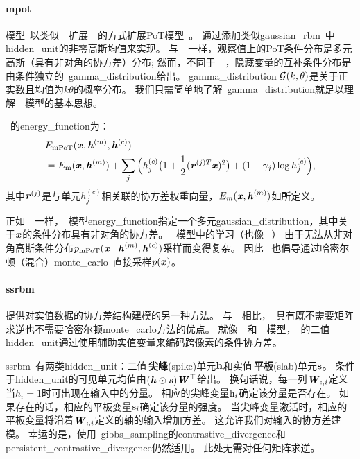  
\paragraph{\gls{mpot}}
模型~\citep{ranzato+mnih+hinton:2010-short}以类似~~扩展~~的方式扩展PoT模型~\citep{Welling2003a-small}。
通过添加类似\gls{gaussian_rbm}~中\gls{hidden_unit}的非零高斯均值来实现。
与~~一样，观察值上的PoT条件分布是多元高斯（具有非对角的协方差）分布; 然而，不同于~~，隐藏变量的互补条件分布是由条件独立的~\gls{gamma_distribution}给出。
\gls{gamma_distribution} $\mathcal{G}(k, \theta)$是关于正实数且均值为$k\theta$的概率分布。
我们只需简单地了解~\gls{gamma_distribution}就足以理解~~模型的基本思想。

~的\gls{energy_function}为：
\begin{align}
 &E_{\text{mPoT}}(\boldsymbol{\mathit{x}}, \boldsymbol{\mathit{h}}^{(m)}, \boldsymbol{\mathit{h}}^{(c)}) \\
 &= E_{\text{m}}(\boldsymbol{\mathit{x}}, \boldsymbol{\mathit{h}}^{(m)}) + \sum_j \Big( h_j^{(c)} \big( 1+\frac{1}{2}(\boldsymbol{\mathit{r}}^{(j)T}\boldsymbol{\mathit{x}})^2  \big)
 +(1-\gamma_j)\log h_j^{(c)} \Big),
\end{align}
其中$\boldsymbol{\mathit{r}}^{(j)}$是与单元$h_j^{(c)}$相关联的协方差权重向量，$E_m(\boldsymbol{\mathit{x}}, \boldsymbol{\mathit{h}}^{(m)})$如所定义。

正如~~一样，~模型\gls{energy_function}指定一个多元\gls{gaussian_distribution}，其中关于$\boldsymbol{\mathit{x}}$的条件分布具有非对角的协方差。
~模型中的学习（也像~ ） 由于无法从非对角高斯条件分布$p_{\text{mPoT}}(\boldsymbol{\mathit{x}}  \mid  \boldsymbol{\mathit{h}}^{(m)}, \boldsymbol{\mathit{h}}^{(c)}) $采样而变得复杂。
因此~\citet{ranzato+mnih+hinton:2010-short} 也倡导通过哈密尔顿（混合）\gls{monte_carlo}~\citep{Neal93b}直接采样$p(\boldsymbol{\mathit{x}})$。


\paragraph{\gls{ssrbm}} \citep{Courville+al-2011}提供对实值数据的协方差结构建模的另一种方法。
与~~相比，~具有既不需要矩阵求逆也不需要哈密尔顿\gls{monte_carlo}方法的优点。
就像~~和~~模型，~的二值\gls{hidden_unit}通过使用辅助实值变量来编码跨像素的条件协方差。


\gls{ssrbm}~有两类\gls{hidden_unit}：二值\,\textbf{尖峰}(spike)单元$\mathbf{h}$和实值\,\textbf{平板}(slab)单元$\mathbf{s}$。
条件于\gls{hidden_unit}的可见单元均值由$(\boldsymbol{\mathit{h}} \odot \boldsymbol{\mathit{s}})\boldsymbol{\mathit{W}}^\top$给出。
换句话说，每一列$\boldsymbol{\mathit{W}}_{:,i}$定义当$h_i=1$时可出现在输入中的分量。
相应的尖峰变量$\mathrm{h}_i$确定该分量是否存在。
如果存在的话，相应的平板变量$\mathrm{s}_i$确定该分量的强度。
当尖峰变量激活时，相应的平板变量将沿着$\boldsymbol{\mathit{W}}_{:,i}$定义的轴的输入增加方差。
这允许我们对输入的协方差建模。
幸运的是，使用~\gls{gibbs_sampling}的\gls{contrastive_divergence}和\gls{persistent_contrastive_divergence}仍然适用。
此处无需对任何矩阵求逆。

